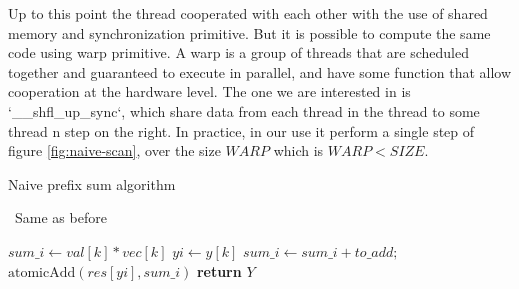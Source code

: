 \documentclass[conference]{IEEEtran}
\begin{document}
Up to this point the thread cooperated with each other with the use of shared memory and synchronization primitive. But it is possible to compute the same code using warp primitive. A warp is a group of threads that are scheduled together and guaranteed to execute in parallel, and have some function that allow cooperation at the hardware level. The one we are interested in is `\_\_shfl\_up\_sync`, which share data from each thread in the thread to some thread n step on the right. In practice, in our use it perform a single step of figure \ref{fig:naive-scan}, over the size $WARP$ which is $WARP < SIZE$.

\begin{algorithm}[h!]
	\caption{Naive prefix sum algorithm}
	\algorithmicrequire~Same as before
	\begin{algorithmic}[1]
		\State {}
		\State $sum\_i \leftarrow  val[k] * vec[k]$
		\State $yi \leftarrow  y[k]$
		\State {}
		\State $sum\_i \leftarrow sum\_i + to\_add;$
		\EndIf
		\EndFor
		\State {}
		\State $\text{atomicAdd}(res[yi], sum\_i)$
		\EndIf
		\EndFor
		\State \textbf{return} $Y$
		\EndProcedure
	\end{algorithmic}
	\label{alg:prefix_sum_alg_equals}
\end{algorithm}
\FloatBarrier
\end{document}
